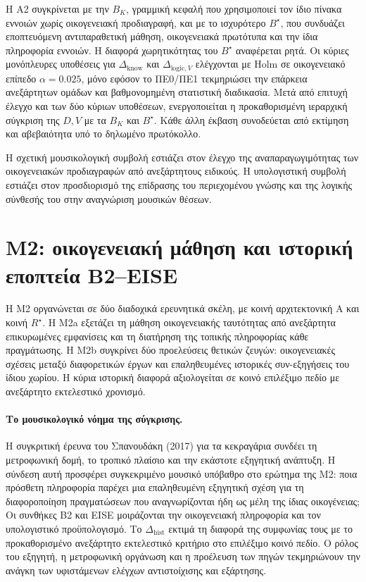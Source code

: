 \documentclass[11pt,a4paper]{article}
\begin{document}
Η Α2 συγκρίνεται με την \textbf{$B_K$}, γραμμική κεφαλή που χρησιμοποιεί τον ίδιο πίνακα εννοιών χωρίς οικογενειακή προδιαγραφή, και με το ισχυρότερο \textbf{$B^\star$}, που συνδυάζει εποπτευόμενη αντιπαραθετική μάθηση, οικογενειακά πρωτότυπα και την ίδια πληροφορία εννοιών. Η διαφορά χωρητικότητας του $B^\star$ αναφέρεται ρητά. Οι κύριες μονόπλευρες υποθέσεις για $\Delta_{\mathrm{know}}$ και $\Delta_{\mathrm{logic},V}$ ελέγχονται με Holm σε οικογενειακό επίπεδο $\alpha=0.025$, μόνο εφόσον το ΠΕ0/ΠΕ1 τεκμηριώσει την επάρκεια ανεξάρτητων ομάδων και βαθμονομημένη στατιστική διαδικασία. Μετά από επιτυχή έλεγχο και των δύο κύριων υποθέσεων, ενεργοποιείται η προκαθορισμένη ιεραρχική σύγκριση της $D,V$ με τα $B_K$ και $B^\star$. Κάθε άλλη έκβαση συνοδεύεται από εκτίμηση και αβεβαιότητα υπό το δηλωμένο πρωτόκολλο.

Η σχετική μουσικολογική συμβολή εστιάζει στον έλεγχο της αναπαραγωγιμότητας των οικογενειακών προδιαγραφών από ανεξάρτητους ειδικούς. Η υπολογιστική συμβολή εστιάζει στον προσδιορισμό της επίδρασης του περιεχομένου γνώσης και της λογικής σύνθεσής του στην αναγνώριση μουσικών θέσεων.

\section{Μ2: οικογενειακή μάθηση και ιστορική εποπτεία B2--EISE}\label{sec:eise}

Η Μ2 οργανώνεται σε δύο διαδοχικά ερευνητικά σκέλη, με κοινή αρχιτεκτονική A και κοινή $R^\star$. Η Μ2a εξετάζει τη μάθηση οικογενειακής ταυτότητας από ανεξάρτητα επικυρωμένες εμφανίσεις και τη διατήρηση της τοπικής πληροφορίας κάθε πραγμάτωσης. Η Μ2b συγκρίνει δύο προελεύσεις θετικών ζευγών: οικογενειακές σχέσεις μεταξύ διαφορετικών έργων και επαληθευμένες ιστορικές συν-εξηγήσεις του ίδιου χωρίου. Η κύρια ιστορική διαφορά αξιολογείται σε κοινό επιλέξιμο πεδίο με ανεξάρτητο εκτελεστικό χρονισμό.

\paragraph{Το μουσικολογικό νόημα της σύγκρισης.} Η συγκριτική έρευνα του Σπανουδάκη (2017) για τα κεκραγάρια συνδέει τη μετροφωνική δομή, το τροπικό πλαίσιο και την εκάστοτε εξηγητική ανάπτυξη. Η σύνδεση αυτή προσφέρει συγκεκριμένο μουσικό υπόβαθρο στο ερώτημα της M2: ποια πρόσθετη πληροφορία παρέχει μια επαληθευμένη εξηγητική σχέση για τη διαφοροποίηση πραγματώσεων που αναγνωρίζονται ήδη ως μέλη της ίδιας οικογένειας; Οι συνθήκες B2 και EISE μοιράζονται την οικογενειακή πληροφορία και τον υπολογιστικό προϋπολογισμό. Το $\Delta_{\mathrm{hist}}$ εκτιμά τη διαφορά της συμφωνίας τους με το προκαθορισμένο ανεξάρτητο εκτελεστικό κριτήριο στο επιλέξιμο κοινό πεδίο. Ο ρόλος του εξηγητή, η μετροφωνική οργάνωση και η προέλευση των πηγών τεκμηριώνουν την ανάγκη των υφιστάμενων ελέγχων αντιστοίχισης και εξάρτησης.
\end{document}
